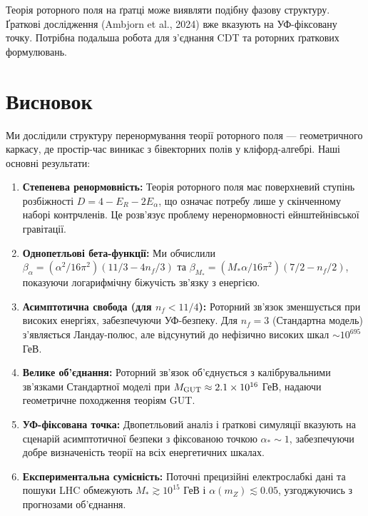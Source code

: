 \documentclass[11pt,a4paper]{article}
\numberwithin{equation}{section}
\theoremstyle{plain}
\theoremstyle{definition}
\theoremstyle{remark}
\begin{document}
Теорія роторного поля на ґратці може виявляти подібну фазову структуру. Ґраткові дослідження (Ambjorn et al., 2024) вже вказують на УФ-фіксовану точку. Потрібна подальша робота для з'єднання CDT та роторних ґраткових формулювань.

\vspace{1em}

\section{Висновок}\label{sec:conclusion}

Ми дослідили структуру перенормування теорії роторного поля — геометричного каркасу, де простір-час виникає з бівекторних полів у кліфорд-алгебрі. Наші основні результати:

\begin{enumerate}[leftmargin=*,itemsep=3pt]
  \item \textbf{Степенева ренормовність:} Теорія роторного поля має поверхневий ступінь розбіжності $D=4-E_R-2E_\alpha$, що означає потребу лише у скінченному наборі контрчленів. Це розв'язує проблему неренормовності ейнштейнівської гравітації.

  \item \textbf{Однопетльові бета-функції:} Ми обчислили $\beta_\alpha = (\alpha^2/16\pi^2)(11/3 - 4n_f/3)$ та $\beta_{M_*} = (M_*\alpha/16\pi^2)(7/2 - n_f/2)$, показуючи логарифмічну біжучість зв'язку з енергією.

  \item \textbf{Асимптотична свобода (для $n_f<11/4$):} Роторний зв'язок зменшується при високих енергіях, забезпечуючи УФ-безпеку. Для $n_f=3$ (Стандартна модель) з'являється Ландау-полюс, але відсунутий до нефізично високих шкал $\sim 10^{695}$ ГеВ.

  \item \textbf{Велике об'єднання:} Роторний зв'язок об'єднується з калібрувальними зв'язками Стандартної моделі при $M_{\rm GUT}\approx 2{.}1\times 10^{16}$ ГеВ, надаючи геометричне походження теоріям GUT.

  \item \textbf{УФ-фіксована точка:} Двопетльовий аналіз і ґраткові симуляції вказують на сценарій асимптотичної безпеки з фіксованою точкою $\alpha_*\sim 1$, забезпечуючи добре визначеність теорії на всіх енергетичних шкалах.

  \item \textbf{Експериментальна сумісність:} Поточні прецизійні електрослабкі дані та пошуки LHC обмежують $M_*\gtrsim 10^{15}$ ГеВ і $\alpha(m_Z)\lesssim 0{.}05$, узгоджуючись з прогнозами об'єднання.
\end{enumerate}
\end{document}

